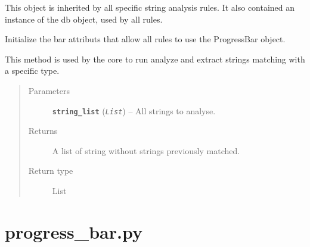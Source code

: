 \documentclass[letterpaper,10pt,oneside]{sphinxmanual}
\begin{document}
\begin{fulllineitems}
\label{index:lib.rules.Rules}
This object is inherited by all specific string analysis rules.
It also contained an instance of the db object, used by all rules.

\begin{fulllineitems}
\label{index:lib.rules.Rules.__init__}
Initialize the bar attributs that allow all rules to use
the ProgressBar object.

\end{fulllineitems}


\begin{fulllineitems}
\label{index:lib.rules.Rules.run_analysis}
This method is used by the core to run analyze and extract strings
matching with a specific type.
\begin{quote}\begin{description}
\item[{Parameters}] \leavevmode
\textbf{\texttt{string\_list}} (\emph{\texttt{List}}) -- All strings to analyse.

\item[{Returns}] \leavevmode
A list of string without strings previously matched.

\item[{Return type}] \leavevmode
List

\end{description}\end{quote}

\end{fulllineitems}


\end{fulllineitems}



\section{progress\_bar.py}
\label{index:progress-bar-py}\label{index:module-lib.progress_bar}
\end{document}
